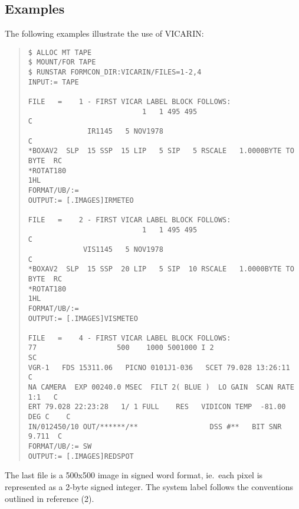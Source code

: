 \subsection {Examples}
The following examples illustrate the use of VICARIN:
\begin{quote}
\begin{verbatim}
$ ALLOC MT TAPE
$ MOUNT/FOR TAPE
$ RUNSTAR FORMCON_DIR:VICARIN/FILES=1-2,4
INPUT:= TAPE

FILE   =    1 - FIRST VICAR LABEL BLOCK FOLLOWS:
                           1   1 495 495                               C
              IR1145   5 NOV1978                                       C
*BOXAV2  SLP  15 SSP  15 LIP   5 SIP   5 RSCALE   1.0000BYTE TO BYTE  RC
*ROTAT180                                                            1HL
FORMAT/UB/:=
OUTPUT:= [.IMAGES]IRMETEO

FILE   =    2 - FIRST VICAR LABEL BLOCK FOLLOWS:
                           1   1 495 495                               C
             VIS1145   5 NOV1978                                       C
*BOXAV2  SLP  15 SSP  20 LIP   5 SIP  10 RSCALE   1.0000BYTE TO BYTE  RC
*ROTAT180                                                            1HL
FORMAT/UB/:=
OUTPUT:= [.IMAGES]VISMETEO

FILE   =    4 - FIRST VICAR LABEL BLOCK FOLLOWS:
77                   500    1000 5001000 I 2                          SC
VGR-1   FDS 15311.06   PICNO 0101J1-036   SCET 79.028 13:26:11         C
NA CAMERA  EXP 00240.0 MSEC  FILT 2( BLUE )  LO GAIN  SCAN RATE  1:1   C
ERT 79.028 22:23:28   1/ 1 FULL    RES   VIDICON TEMP  -81.00 DEG C    C
IN/012450/10 OUT/******/**                 DSS #**   BIT SNR    9.711  C
FORMAT/UB/:= SW
OUTPUT:= [.IMAGES]REDSPOT
\end{verbatim}
\end{quote}
The last file is a 500x500 image in signed word format, ie.\ each pixel is
represented as a 2-byte signed integer.
The system label follows the conventions outlined in reference (2).

